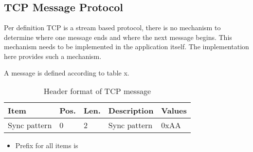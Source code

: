\documentclass{stddoc}
\begin{document}
\subsection{TCP Message Protocol}
	Per definition TCP is a stream based protocol, there is no mechanism
	to determine where one message ends and where the next message begins.
	This mechanism needs to be implemented in the application itself.
	The implementation here provides such a mechanism.

	A message is defined according to table x.

	\begin{longtable}{|L{1.5cm}|L{0.8cm}|L{0.8cm}|L{9cm}|L{1.8cm}|}
		\caption{Header format of TCP message} \\
		\hline
		\textbf{Item} & Pos. & Len. & Description & Values \\
		\hline \hline
		Sync pattern & 0 & 2 & Sync pattern & 0xAA \\
		\hline
	\end{longtable}

	\begin{itemize}
		\item Prefix for all items is 
	\end{itemize}
\end{document}
